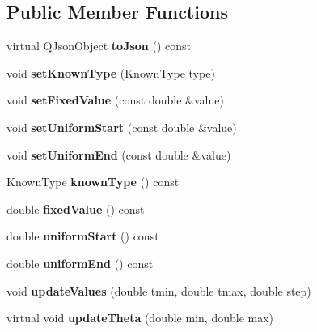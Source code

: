 \subsection*{Public Member Functions}
\begin{DoxyCompactItemize}
\item 
\hypertarget{class_event_known_a19ecbaf89efcae189e2a0b998ebf9f74}{virtual Q\-Json\-Object {\bfseries to\-Json} () const }\label{class_event_known_a19ecbaf89efcae189e2a0b998ebf9f74}

\item 
\hypertarget{class_event_known_a6de6105f24d7815a948959488029eb99}{void {\bfseries set\-Known\-Type} (Known\-Type type)}\label{class_event_known_a6de6105f24d7815a948959488029eb99}

\item 
\hypertarget{class_event_known_a01f4851c8cb04c58ba002707656a7e5b}{void {\bfseries set\-Fixed\-Value} (const double \&value)}\label{class_event_known_a01f4851c8cb04c58ba002707656a7e5b}

\item 
\hypertarget{class_event_known_aec1b688361c31a9ada2a380c289c58f4}{void {\bfseries set\-Uniform\-Start} (const double \&value)}\label{class_event_known_aec1b688361c31a9ada2a380c289c58f4}

\item 
\hypertarget{class_event_known_a8f2742321bea87956b37afd620b2bb99}{void {\bfseries set\-Uniform\-End} (const double \&value)}\label{class_event_known_a8f2742321bea87956b37afd620b2bb99}

\item 
\hypertarget{class_event_known_a617a1d894010c079dc223e7f4a0d434c}{Known\-Type {\bfseries known\-Type} () const }\label{class_event_known_a617a1d894010c079dc223e7f4a0d434c}

\item 
\hypertarget{class_event_known_a9367d41f849ad31c352e72da1dc8527b}{double {\bfseries fixed\-Value} () const }\label{class_event_known_a9367d41f849ad31c352e72da1dc8527b}

\item 
\hypertarget{class_event_known_a047969c82c05b4757fc105b3bde590c4}{double {\bfseries uniform\-Start} () const }\label{class_event_known_a047969c82c05b4757fc105b3bde590c4}

\item 
\hypertarget{class_event_known_aa0f45d6b8ae0c7549fff5563548699d6}{double {\bfseries uniform\-End} () const }\label{class_event_known_aa0f45d6b8ae0c7549fff5563548699d6}

\item 
\hypertarget{class_event_known_a59a6364480b8284d0bc97f663e89738d}{void {\bfseries update\-Values} (double tmin, double tmax, double step)}\label{class_event_known_a59a6364480b8284d0bc97f663e89738d}

\item 
\hypertarget{class_event_known_a3334510ae2d9754bcda83c12f23a1e9b}{virtual void {\bfseries update\-Theta} (double min, double max)}\label{class_event_known_a3334510ae2d9754bcda83c12f23a1e9b}

\end{DoxyCompactItemize}
